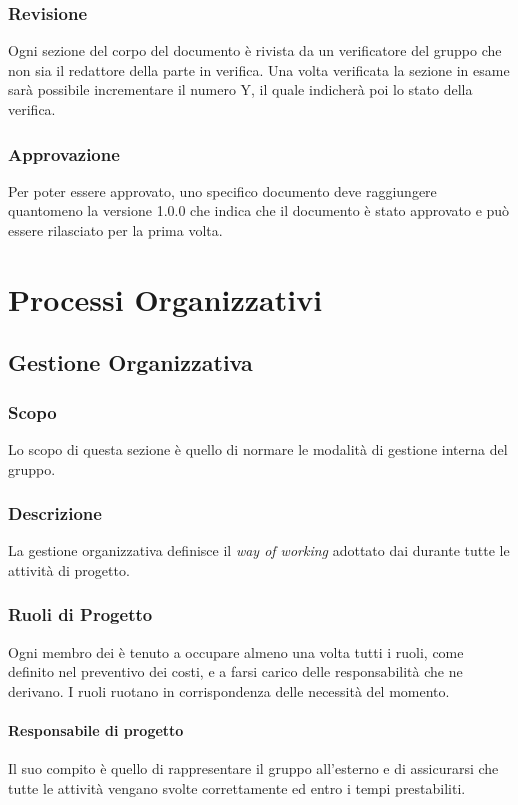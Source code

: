 \subsubsection{Revisione}
Ogni sezione del corpo del documento è rivista da un verificatore del gruppo che non sia il
redattore della parte in verifica. Una volta verificata la sezione in esame sarà possibile
incrementare il numero Y, il quale indicherà poi lo stato della verifica.

\subsubsection{Approvazione}
Per poter essere approvato, uno specifico documento deve raggiungere quantomeno la versione 1.0.0 che indica che il documento è stato approvato e può essere rilasciato per la prima volta.

\pagebreak

\section{Processi Organizzativi}
\subsection{Gestione Organizzativa}

\subsubsection{Scopo}
Lo scopo di questa sezione è quello di normare le modalità di gestione interna del gruppo.

\subsubsection{Descrizione}
La gestione organizzativa definisce il \textit{way of working} adottato dai \groupName{} durante tutte le attività di progetto.

\subsubsection{Ruoli di Progetto}
Ogni membro dei \groupName{} è tenuto a occupare almeno una volta tutti i ruoli, come definito nel preventivo dei costi, e a farsi carico delle responsabilità che ne derivano. 
I ruoli ruotano in corrispondenza delle necessità del momento.

\paragraph{Responsabile di progetto}
Il suo compito è quello di rappresentare il gruppo all'esterno e di assicurarsi che tutte le attività vengano svolte correttamente ed entro i tempi prestabiliti.

